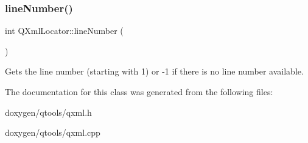 \subsubsection{\texorpdfstring{lineNumber()}{lineNumber()}}
{\footnotesize\ttfamily int Q\+Xml\+Locator\+::line\+Number (\begin{DoxyParamCaption}{ }\end{DoxyParamCaption})}

Gets the line number (starting with 1) or -\/1 if there is no line number available. 

The documentation for this class was generated from the following files\+:\begin{DoxyCompactItemize}
\item 
doxygen/qtools/qxml.\+h\item 
doxygen/qtools/qxml.\+cpp\end{DoxyCompactItemize}
